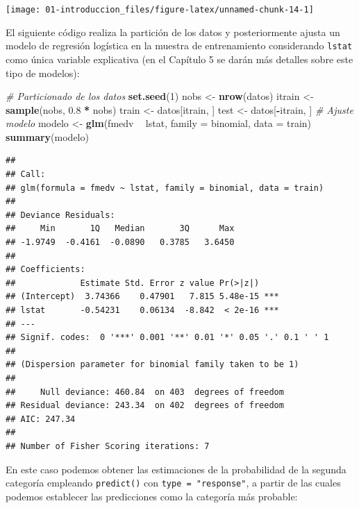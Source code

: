 \documentclass[]{book}
\newenvironment{Shaded}{\begin{snugshade}}{\end{snugshade}}
\newcommand{\KeywordTok}[1]{\textcolor[rgb]{0.13,0.29,0.53}{\textbf{#1}}}
\newcommand{\DataTypeTok}[1]{\textcolor[rgb]{0.13,0.29,0.53}{#1}}
\newcommand{\DecValTok}[1]{\textcolor[rgb]{0.00,0.00,0.81}{#1}}
\newcommand{\FloatTok}[1]{\textcolor[rgb]{0.00,0.00,0.81}{#1}}
\newcommand{\StringTok}[1]{\textcolor[rgb]{0.31,0.60,0.02}{#1}}
\newcommand{\CommentTok}[1]{\textcolor[rgb]{0.56,0.35,0.01}{\textit{#1}}}
\newcommand{\OperatorTok}[1]{\textcolor[rgb]{0.81,0.36,0.00}{\textbf{#1}}}
\newcommand{\NormalTok}[1]{#1}
\theoremstyle{break}
\theoremstyle{definition}
\theoremstyle{definition}
\theoremstyle{definition}
\theoremstyle{remark}
\begin{document}
\begin{center}\texttt{[image: 01-introduccion\_files/figure-latex/unnamed-chunk-14-1]} \end{center}

El siguiente código realiza la partición de los datos y posteriormente
ajusta un modelo de regresión logística en la muestra de entrenamiento
considerando \texttt{lstat} como única variable explicativa (en el
Capítulo 5 se darán más detalles sobre este tipo de modelos):

\begin{Shaded}
\begin{Highlighting}[]
\CommentTok{# Particionado de los datos}
\KeywordTok{set.seed}\NormalTok{(}\DecValTok{1}\NormalTok{)}
\NormalTok{nobs <-}\StringTok{ }\KeywordTok{nrow}\NormalTok{(datos)}
\NormalTok{itrain <-}\StringTok{ }\KeywordTok{sample}\NormalTok{(nobs, }\FloatTok{0.8} \OperatorTok{*}\StringTok{ }\NormalTok{nobs)}
\NormalTok{train <-}\StringTok{ }\NormalTok{datos[itrain, ]}
\NormalTok{test <-}\StringTok{ }\NormalTok{datos[}\OperatorTok{-}\NormalTok{itrain, ]}
\CommentTok{# Ajuste modelo}
\NormalTok{modelo <-}\StringTok{ }\KeywordTok{glm}\NormalTok{(fmedv }\OperatorTok{~}\StringTok{ }\NormalTok{lstat, }\DataTypeTok{family =}\NormalTok{ binomial, }\DataTypeTok{data =}\NormalTok{ train)}
\KeywordTok{summary}\NormalTok{(modelo)}
\end{Highlighting}
\end{Shaded}

\begin{verbatim}
## 
## Call:
## glm(formula = fmedv ~ lstat, family = binomial, data = train)
## 
## Deviance Residuals: 
##     Min       1Q   Median       3Q      Max  
## -1.9749  -0.4161  -0.0890   0.3785   3.6450  
## 
## Coefficients:
##             Estimate Std. Error z value Pr(>|z|)    
## (Intercept)  3.74366    0.47901   7.815 5.48e-15 ***
## lstat       -0.54231    0.06134  -8.842  < 2e-16 ***
## ---
## Signif. codes:  0 '***' 0.001 '**' 0.01 '*' 0.05 '.' 0.1 ' ' 1
## 
## (Dispersion parameter for binomial family taken to be 1)
## 
##     Null deviance: 460.84  on 403  degrees of freedom
## Residual deviance: 243.34  on 402  degrees of freedom
## AIC: 247.34
## 
## Number of Fisher Scoring iterations: 7
\end{verbatim}

En este caso podemos obtener las estimaciones de la probabilidad de la
segunda categoría empleando \texttt{predict()} con
\texttt{type\ =\ "response"}, a partir de las cuales podemos establecer
las predicciones como la categoría más probable:
\end{document}
